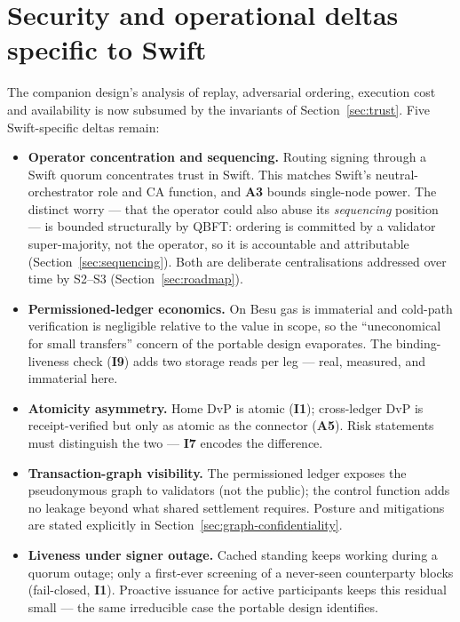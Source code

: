 \documentclass[11pt,a4paper]{article}
\newcommand{\Aref}[1]{\textbf{A#1}}
\newcommand{\Iref}[1]{\textbf{I#1}}
\begin{document}
\section{Security and operational deltas specific to Swift}
\label{sec:security}

The companion design's analysis of replay, adversarial ordering, execution cost
and availability is now subsumed by the invariants of Section~\ref{sec:trust}.
Five Swift-specific deltas remain:
\begin{itemize}[leftmargin=1.4em,itemsep=2pt]
  \item \textbf{Operator concentration and sequencing.} Routing signing through a
  Swift quorum concentrates trust in Swift. This matches Swift's
  neutral-orchestrator role and CA function, and \Aref{3} bounds single-node
  power. The distinct worry --- that the operator could also abuse its
  \emph{sequencing} position --- is bounded structurally by QBFT: ordering is
  committed by a validator super-majority, not the operator, so it is accountable
  and attributable (Section~\ref{sec:sequencing}). Both are deliberate
  centralisations addressed over time by S2--S3 (Section~\ref{sec:roadmap}).
  \item \textbf{Permissioned-ledger economics.} On Besu gas is immaterial and
  cold-path verification is negligible relative to the value in scope, so the
  ``uneconomical for small transfers'' concern of the portable design evaporates.
  The binding-liveness check (\Iref{9}) adds two storage reads per leg --- real,
  measured, and immaterial here.
  \item \textbf{Atomicity asymmetry.} Home DvP is atomic (\Iref{1}); cross-ledger
  DvP is receipt-verified but only as atomic as the connector (\Aref{5}). Risk
  statements must distinguish the two --- \Iref{7} encodes the difference.
  \item \textbf{Transaction-graph visibility.} The permissioned ledger exposes the
  pseudonymous graph to validators (not the public); the control function adds no
  leakage beyond what shared settlement requires. Posture and mitigations are
  stated explicitly in Section~\ref{sec:graph-confidentiality}.
  \item \textbf{Liveness under signer outage.} Cached standing keeps working
  during a quorum outage; only a first-ever screening of a never-seen counterparty
  blocks (fail-closed, \Iref{1}). Proactive issuance for active participants keeps
  this residual small --- the same irreducible case the portable design identifies.
\end{itemize}
\end{document}
